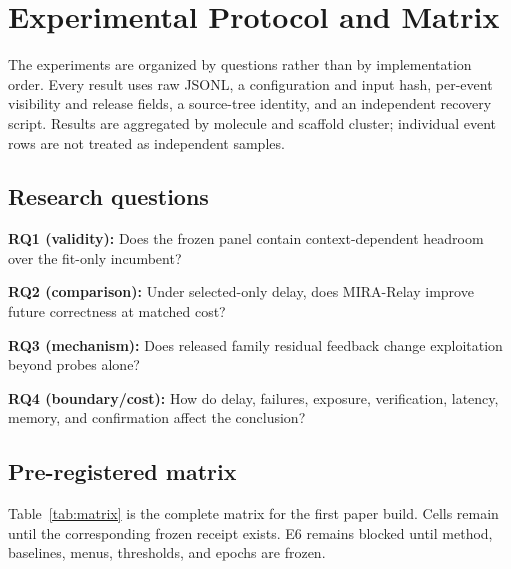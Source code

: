 \documentclass[sigconf,anonymous]{aamas}
\newcommand{\tbd}{\text{TBD}}
\begin{document}
\section{Experimental Protocol and Matrix}
The experiments are organized by questions rather than by implementation order. Every result uses raw JSONL, a configuration and input hash, per-event visibility and release fields, a source-tree identity, and an independent recovery script. Results are aggregated by molecule and scaffold cluster; individual event rows are not treated as independent samples.

\subsection{Research questions}
\textbf{RQ1 (validity):} Does the frozen panel contain context-dependent headroom over the fit-only incumbent?\par
\textbf{RQ2 (comparison):} Under selected-only delay, does MIRA-Relay improve future correctness at matched cost?\par
\textbf{RQ3 (mechanism):} Does released family residual feedback change exploitation beyond probes alone?\par
\textbf{RQ4 (boundary/cost):} How do delay, failures, exposure, verification, latency, memory, and confirmation affect the conclusion?

\subsection{Pre-registered matrix}
Table~\ref{tab:matrix} is the complete matrix for the first paper build. Cells remain \tbd{} until the corresponding frozen receipt exists. E6 remains blocked until method, baselines, menus, thresholds, and epochs are frozen.
\end{document}
